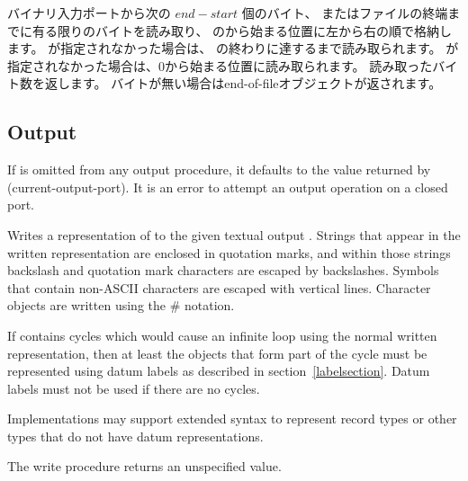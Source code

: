 \begin{entry}{%
}

バイナリ入力ポートから次の $end - start$ 個のバイト、
またはファイルの終端までに有る限りのバイトを読み取り、
のから始まる位置に左から右の順で格納します。
が指定されなかった場合は、
の終わりに達するまで読み取られます。
が指定されなかった場合は、0から始まる位置に読み取られます。
読み取ったバイト数を返します。
バイトが無い場合はend-of-fileオブジェクトが返されます。

\end{entry}


\subsection{Output}
\label{outputsection}

If  is omitted from any output procedure, it defaults to the
value returned by {\cf (current-output-port)}.
It is an error to attempt an output operation on a closed port.

\noindent \hbox{}
\vspace{-5ex}

\begin{entry}{%
}

Writes a representation of  to the given textual output
.  Strings
that appear in the written representation are enclosed in quotation marks, and
within those strings backslash and quotation mark characters are
escaped by backslashes.  Symbols that contain non-ASCII characters
are escaped with vertical lines.
Character objects are written using the {\cf \#\backwhack} notation.

If  contains cycles which would cause an infinite loop using
the normal written representation, then at least the objects that form
part of the cycle must be represented using datum labels as described
in section~\ref{labelsection}.  Datum labels must not be used if there
are no cycles.

Implementations may support extended syntax to represent record types or
other types that do not have datum representations.

The {\cf write} procedure returns an unspecified value.

\end{entry}

